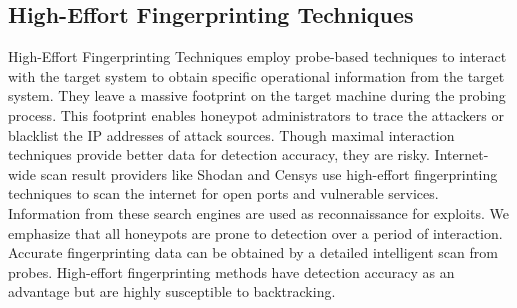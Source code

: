 \documentclass[../main.tex]{subfiles}
\begin{document}
 
 \subsection{High-Effort Fingerprinting Techniques}
High-Effort Fingerprinting Techniques employ probe-based techniques to interact with the target system to obtain specific operational information from the target system. They leave a massive footprint on the target machine during the probing process. This footprint enables honeypot administrators to trace the attackers or blacklist the IP addresses of attack sources. Though maximal interaction techniques provide better data for detection accuracy, they are risky. Internet-wide scan result providers like Shodan and Censys use high-effort fingerprinting techniques to scan the internet for open ports and vulnerable services. Information from these search engines are used as reconnaissance for exploits. We emphasize that all honeypots are prone to detection over a period of interaction. Accurate fingerprinting data can be obtained by a detailed intelligent scan from probes. High-effort fingerprinting methods have detection accuracy as an advantage but are highly susceptible to backtracking. 
\end{document}
